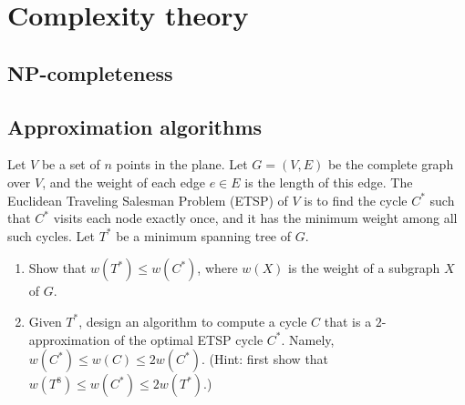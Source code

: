 \chapter{Complexity theory}
\begin{refsection}

\section{NP-completeness}


\section{Approximation algorithms}
\begin{Exercise}
Let $V$ be a set of $n$ points in the plane. Let $G = (V, E)$ be the complete graph over $V$, and the weight of each edge $e \in E$ is the length of this edge. The Euclidean Traveling Salesman Problem (ETSP) of $V$ is to find the cycle $C^*$ such that $C^*$ visits each node exactly once, and it has the minimum weight among all such cycles. Let $T^*$ be a minimum spanning tree of $G$.
\begin{enumerate}
\item Show that $w(T^*) \leq w(C^*)$, where $w(X)$ is the weight of a subgraph $X$ of $G$.
\item Given $T^*$, design an algorithm to compute a cycle $C$ that is a $2$-approximation of the optimal ETSP cycle $C^*$. Namely, $w(C^*) \leq w(C) \leq 2w(C^*)$. (Hint: first show that $w(T^8) \leq w(C^*) \leq 2w(T^*)$.)
\end{enumerate}
\end{Exercise}
\begin{Answer}
\end{Answer}

\printbibliography[heading=subbibliography]
\end{refsection}
